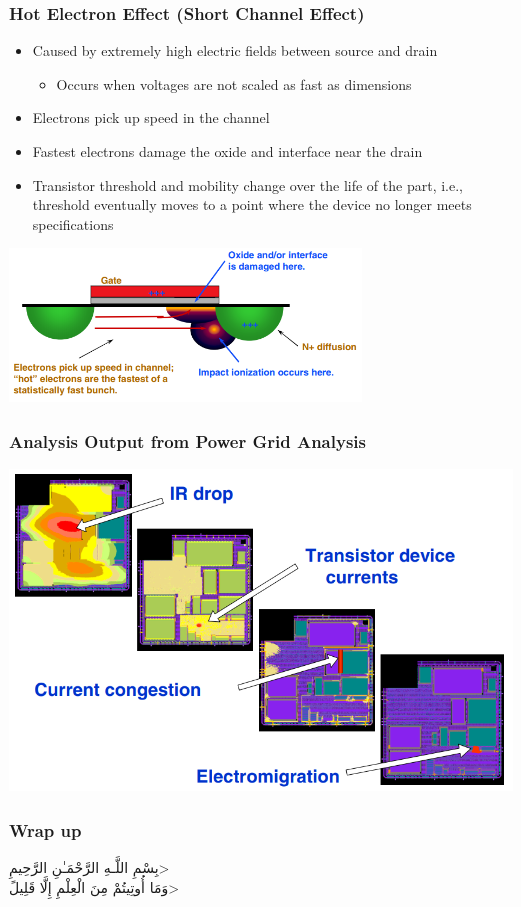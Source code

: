 \documentclass{beamer}
\begin{document}
	\begin{frame}
		\frametitle{Hot Electron Effect (Short Channel Effect)}
	\begin{itemize}
		\item Caused by extremely high electric fields between source and drain
		\begin{itemize}
			\item Occurs when voltages are not scaled as fast as dimensions
		\end{itemize}	
		\item Electrons pick up speed in the channel
		\item Fastest electrons damage the oxide and interface near the drain
		\item Transistor threshold and mobility change over the life of the part, i.e.,
		threshold eventually moves to a point where the device no longer meets
		specifications
	\end{itemize}
	\begin{center}
	\includegraphics[width=0.7\textwidth]{hot}
\end{center}
	\end{frame}
	\begin{frame}
		\frametitle{Analysis Output from Power Grid Analysis}
			\begin{center}
				\includegraphics[width=\textwidth]{analysis}
			\end{center}
	\end{frame}
	\begin{frame}
		\frametitle{Wrap up}
		\begin{center}
			\<بِسْمِ اللَّـهِ الرَّحْمَـٰنِ الرَّحِيمِ> \\
			\<وَمَا أُوتِيتُمْ مِنَ الْعِلْمِ إِلَّا قَلِيلً>
			
		\end{center}
	\end{frame}	
\end{document}
